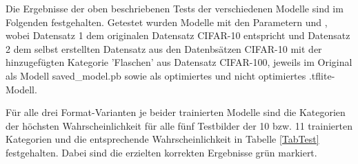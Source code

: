 Die Ergebnisse der oben beschriebenen Tests der verschiedenen Modelle sind im Folgenden festgehalten. Getestet wurden Modelle mit den Parametern und
, wobei Datensatz 1 dem originalen Datensatz CIFAR-10 entspricht und Datensatz 2 dem selbst erstellten Datensatz aus den Datenbsätzen CIFAR-10 mit der hinzugefügten Kategorie 'Flaschen' aus Datensatz CIFAR-100, jeweils im Original als Modell saved\_model.pb sowie als optimiertes und nicht optimiertes .tflite-Modell.

Für alle drei Format-Varianten je beider trainierten Modelle sind die Kategorien der höchsten Wahrscheinlichkeit 
für alle fünf Testbilder der 10 bzw. 11 trainierten Kategorien und die entsprechende Wahrscheinlichkeit in Tabelle \ref{TabTest} festgehalten. Dabei sind die erzielten korrekten Ergebnisse grün markiert.



